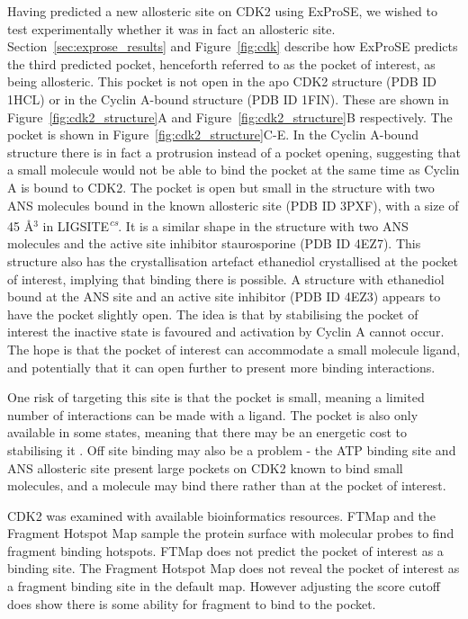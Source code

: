 Having predicted a new allosteric site on CDK2 using ExProSE, we wished to test experimentally whether it was in fact an allosteric site.
Section~\ref{sec:exprose_results} and Figure~\ref{fig:cdk} describe how ExProSE predicts the third predicted pocket, henceforth referred to as the pocket of interest, as being allosteric.
This pocket is not open in the apo CDK2 structure (PDB ID 1HCL) or in the Cyclin A-bound structure (PDB ID 1FIN).
These are shown in Figure~\ref{fig:cdk2_structure}A and Figure~\ref{fig:cdk2_structure}B respectively.
The pocket is shown in Figure~\ref{fig:cdk2_structure}C-E.
In the Cyclin A-bound structure there is in fact a protrusion instead of a pocket opening, suggesting that a small molecule would not be able to bind the pocket at the same time as Cyclin A is bound to CDK2.
The pocket is open but small in the structure with two ANS molecules bound in the known allosteric site (PDB ID 3PXF), with a size of 45 \AA$^{3}$ in LIGSITE\textsuperscript{\it cs}.
It is a similar shape in the structure with two ANS molecules and the active site inhibitor staurosporine (PDB ID 4EZ7).
This structure also has the crystallisation artefact ethanediol crystallised at the pocket of interest, implying that binding there is possible.
A structure with ethanediol bound at the ANS site and an active site inhibitor (PDB ID 4EZ3) appears to have the pocket slightly open.
The idea is that by stabilising the pocket of interest the inactive state is favoured and activation by Cyclin A cannot occur.
The hope is that the pocket of interest can accommodate a small molecule ligand, and potentially that it can open further to present more binding interactions.

One risk of targeting this site is that the pocket is small, meaning a limited number of interactions can be made with a ligand.
The pocket is also only available in some states, meaning that there may be an energetic cost to stabilising it \cite{Oleinikovas2016}.
Off site binding may also be a problem - the ATP binding site and ANS allosteric site present large pockets on CDK2 known to bind small molecules, and a molecule may bind there rather than at the pocket of interest.

CDK2 was examined with available bioinformatics resources.
FTMap \cite{Kozakov2015} and the Fragment Hotspot Map \cite{Radoux2016} sample the protein surface with molecular probes to find fragment binding hotspots.
FTMap \cite{Kozakov2015} does not predict the pocket of interest as a binding site.
The Fragment Hotspot Map \cite{Radoux2016} does not reveal the pocket of interest as a fragment binding site in the default map.
However adjusting the score cutoff does show there is some ability for fragment to bind to the pocket.

